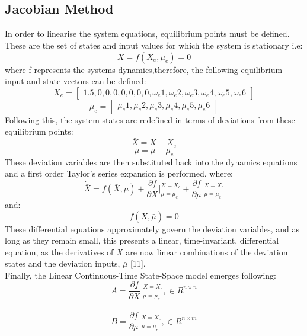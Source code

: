 \documentclass[12pt,a4paper,twoside]{report}
\begin{document}
				\subsection{Jacobian Method}
					
					In order to linearise the system equations, equilibrium points must be defined. These are the set of states and input values for which the system is stationary i.e:
					\[\dot{X} = f(X_e,\mu_e) = 0\]
					where f represents the systems dynamics,therefore, the following equilibrium input and state vectors can be defined:
					$$
					X_e = 
					\begin{bmatrix}
						1.5,0,0,0,0,0,0,0,\omega_e1,\omega_e2,\omega_e3,\omega_e4,\omega_e5,\omega_e6
					\end{bmatrix}
					$$
					$$
					\mu_e = 
					\begin{bmatrix}
						\mu_e1,\mu_e2,\mu_e3,\mu_e4,\mu_e5,\mu_e6
					\end{bmatrix}
					$$
					Following this, the system states are redefined in terms of deviations from these equilibrium points:
					\[\bar{X} = X - X_e\] 
					\[\bar{\mu} = \mu - \mu_e\] 
					These deviation variables are then substituted back into the dynamics equations and a first order Taylor's series expansion is performed. where:
					\begin{equation}
						\dot{\bar{X}} = f(\bar{X},\bar{\mu}) + \frac{\partial f}{\partial X}\bigg\vert_{\mu = \mu_e}^{X = X_e} + \frac{\partial f}{\partial \mu}\bigg\vert_{\mu = \mu_e}^{X = X_e}
					\end{equation}
					and:
					\[ f(\bar{X},\bar{\mu}) = 0 \]
					These differential equations approximately govern the deviation variables, and as long as they remain small, this presents a linear, time-invariant, differential equation, as the derivatives of $\bar{X}$ are now linear combinations of the deviation states and the deviation inputs, $\bar{\mu}$ [11]. 
					\\
					Finally, the Linear Continuous-Time State-Space model emerges following:
					\\
					\begin{equation}
						A = \frac{\partial f}{\partial X}\bigg\vert_{\mu = \mu_e}^{X = X_e}, \in R ^{n\times n}
					\end{equation}
					\\
					\begin{equation}
						B = \frac{\partial f}{\partial \mu}\bigg\vert_{\mu = \mu_e}^{X = X_e} , \in R ^{n\times m}
					\end{equation} 
\end{document}
